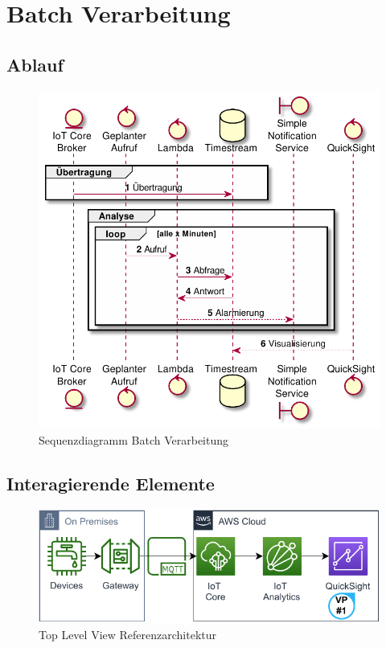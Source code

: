 \section{Batch Verarbeitung}

\subsection{Ablauf}

\begin{figure}[H]
\centering
\includegraphics[width=\textwidth]{graphics/batch-ra.pdf}
\caption{Sequenzdiagramm Batch Verarbeitung}
\label{abb:SequenceBatchRA}
\end{figure}

\subsection{Interagierende Elemente}
\begin{figure}[H]
\centering
\includegraphics[width=\textwidth]{graphics/DB-RA-Overview.pdf}
\caption{Top Level View Referenzarchitektur}
\label{abb:TopLevelDBRA}
\end{figure}

